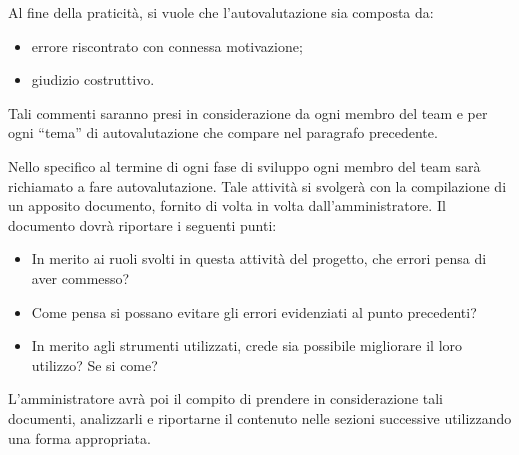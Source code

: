 Al fine della praticità, si vuole che l'autovalutazione sia composta da:

\begin{itemize}
	\item errore riscontrato con connessa motivazione;
	\item giudizio costruttivo.
\end{itemize}

Tali commenti saranno presi in considerazione da ogni membro del team e per ogni ``tema'' di autovalutazione che compare nel paragrafo precedente.

Nello specifico al termine di ogni fase di sviluppo ogni membro del team sarà richiamato a fare autovalutazione. Tale attività si svolgerà con la compilazione di un apposito documento, fornito di volta in volta dall'amministratore. Il documento dovrà riportare i seguenti punti:

\begin{itemize}
	\item In merito ai ruoli svolti in questa attività del progetto, che errori pensa di aver commesso?
	\item Come pensa si possano evitare gli errori evidenziati al punto precedenti?
	\item In merito agli strumenti utilizzati, crede sia possibile migliorare il loro utilizzo? Se si come?
\end{itemize}

L'amministratore avrà poi il compito di prendere in considerazione tali documenti, analizzarli e riportarne il contenuto nelle sezioni successive utilizzando una forma appropriata.

